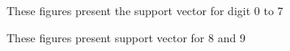 \documentclass[11pt]{article}
\begin{document}
\begin{figure}[htbp]
\begin{center}
\caption{These figures present the support vector for digit 0 to 7}
\end{center}\label{figure1}
\end{figure}
\begin{figure}[htbp]
\begin{center}
\caption{These figures present support vector for 8 and 9}
\end{center}\label{figure2}
\end{figure}
\end{document}
